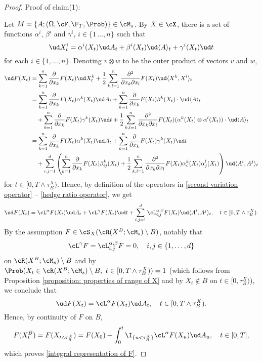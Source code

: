 \documentclass[11pt]{article}
\begin{document}
\begin{proof}

\item Proof of claim(1): 

Let $M = \{A; (\Omega, \cF, \F_T, \Prob)\} \in \cM_s$. By $X \in \cX$, there is a set of functions $\alpha^i$, $\beta^i$ and $\gamma^i$, $i \in \{1\,\ldots,n\}$ such that
$$
\ud X^i_t = \alpha^i(X_t) \ud A_t + \beta^i(X_t) \ud \langle A \rangle_t + \gamma^i(X_t) \ud t
$$
for each $i \in \{1,\ldots,n\}$. Denoting $v \otimes w$ to be the outer product of vectors $v$ and $w$,
\begin{align*}
\ud F(X_t) &= \sum_{k=1}^n \frac{\partial}{\partial x_k} F(X_t) \ud X^k_t + \frac{1}{2} \sum_{k,l=1}^n \frac{\partial^2}{\partial x_k \partial x_l} F(X_t) \ud \langle X^k, X^l \rangle_t \\
%
%
%
&= \sum_{k=1}^n \frac{\partial}{\partial x_k} F(X_t) \alpha^k(X_t) \ud A_t + \sum_{k=1}^n \frac{\partial}{\partial x_k} F(X_t) \beta^k(X_t) \cdot \ud \langle A \rangle_t \\
& \quad + \sum_{k=1}^n \frac{\partial}{\partial x_k} F(X_t) \gamma^k(X_t) \ud t + \frac{1}{2} \sum_{k,l=1}^n \frac{\partial^2}{\partial x_k \partial x_l} F(X_t) ( \alpha^k(X_t) \otimes \alpha^l(X_t) ) \cdot \ud \langle A \rangle_t \\
%
%
%
&= \sum_{k=1}^n \frac{\partial}{\partial x_k} F(X_t) \alpha^k(X_t) \ud A_t + \sum_{k=1}^n \frac{\partial}{\partial x_k} F(X_t) \gamma^k(X_t) \ud t \\
& \quad + \sum_{i,j=1}^d \left( \sum_{k=1}^n \frac{\partial}{\partial x_k} F(X_t) \beta^k_{ij}(X_t) + \frac{1}{2} \sum_{k,l=1}^n \frac{\partial^2}{\partial x_k \partial x_l} F(X_t) \alpha^k_i(X_t) \alpha^l_j (X_t) \right) \ud \langle A^i, A^j \rangle_t
\end{align*}
for $t \in [0, T \wedge \tau^X_B)$. Hence, by definition of the operators in \eqref{second variation operator} -- \eqref{hedge ratio operator}, we get
$$
\ud F(X_t) = \cL^\alpha F(X_t) \ud A_t + \cL^\gamma F(X_t) \ud t + \sum_{i,j=1}^d \cL^{\alpha,\beta}_{i,j} F(X_t) \ud \langle A^i, A^j \rangle_t, \quad t \in [0, T \wedge \tau^X_B).
$$
By the assumption $F \in \cS_X(\cR(X^B; \cM_s) \setminus B)$, notably that
$$
\cL^\gamma F = \cL^{\alpha,\beta}_{i,j} F = 0, \quad i, j \in \{1,\ldots,d\}
$$
on $\cR(X^B; \cM_s) \setminus B$ and by $\Prob(X_t \in \cR(X^B; \cM_s) \setminus B, \ t \in [0,T \wedge \tau^X_B)) = 1$ (which follows from Proposition \ref{proposition: properties of range of X} and by $X_t \not\in B$ on $t \in [0, \tau^X_B)$), we conclude that
$$
\ud F(X_t) = \cL^\alpha F(X_t) \ud A_t, \quad t \in [0, T \wedge \tau^X_B).
$$
Hence, by continuity of $F$ on $B$,
$$
F(X^B_t) = F(X_{t \wedge \tau^X_B}) = F(X_0) + \int_0^t \I_{\{u < \tau^X_B\}} \cL^\alpha F(X_u) \ud A_u, \quad t \in [0,T],
$$
which proves \eqref{integral representation of F}.


\end{proof}
\end{document}

